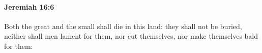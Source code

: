 
		\paragraph{Jeremiah 16:6} %
			\label{JEREMIAH-16-6}

			Both the great and the small shall die in this land: they shall not be buried, neither shall men lament for them, nor cut themselves, nor make themselves bald for them:



